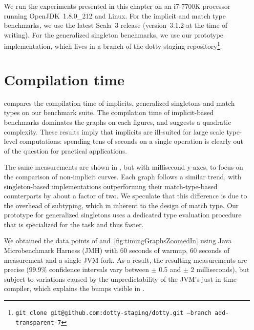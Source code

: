 We run the experiments presented in this chapter on an i7-7700K processor running OpenJDK~1.8.0\_212 and Linux.
For the implicit and match type benchmarks, we use the latest Scala~3 release (version~3.1.2 at the time of writing).
For the generalized singleton benchmarks, we use our prototype implementation, which lives in a branch of the dotty-staging repository\footnote{\texttt{git clone git@github.com:dotty-staging/dotty.git --branch add-transparent-7}}.

\section{Compilation time}
\label{sec:compilation-time}


 compares the compilation time of implicits, generalized singletons and match types on our benchmark suite.
The compilation time of implicit-based benchmarks dominates the graphs on each figures, and suggests a quadratic complexity.
These results imply that implicits are ill-suited for large scale type-level computations: spending tens of seconds on a single operation is clearly out of the question for practical applications.


The same measurements are shown in , but with millisecond y-axes, to focus on the comparison of non-implicit curves.
Each graph follows a similar trend, with singleton-based implementations outperforming their match-type-based counterparts by about a factor of two.
We speculate that this difference is due to the overhead of subtyping, which in inherent to the design of match type.
Our prototype for generalized singletons uses a dedicated type evaluation procedure that is specialized for the task and thus faster.

We obtained the data points of  and~\ref{fig:timingGraphsZoomedIn} using Java Microbenchmark Harness (JMH) with 60 seconds of warmup, 60 seconds of measurement and a single JVM fork.
As a result, the resulting measurements are precise (99.9\% confidence intervals vary between $\pm$ 0.5 and $\pm$ 2 milliseconds), but subject to variations caused by the unpredictability of the JVM's just in time compiler, which explains the bumps visible in .

